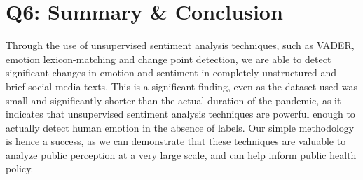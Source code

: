 \section*{Q6: Summary \& Conclusion}
Through the use of unsupervised sentiment analysis techniques, such as VADER, emotion lexicon-matching and change point detection, we are able to detect significant changes in emotion and sentiment in completely unstructured and brief social media texts. This is a significant finding, even as the dataset used was small and significantly shorter than the actual duration of the pandemic, as it indicates that unsupervised sentiment analysis techniques are powerful enough to actually detect human emotion in the absence of labels. Our simple methodology is hence a success, as we can demonstrate that these techniques are valuable to analyze public perception at a very large scale, and can help inform public health policy.

